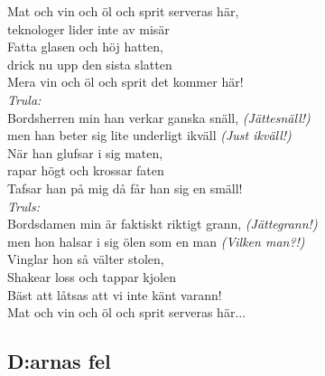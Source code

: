 \noindent Mat och vin och öl och sprit serveras här,\\
\noindent teknologer lider inte av misär\\
\noindent Fatta glasen och höj hatten,\\
\noindent drick nu upp den sista slatten\\
\noindent Mera vin och öl och sprit det kommer här!\\

\noindent \textit{Trula:}\\
\noindent Bordsherren min han verkar ganska snäll, \textit{(Jättesnäll!)}\\
\noindent men han beter sig lite underligt ikväll \textit{(Just ikväll!)}\\
\noindent När han glufsar i sig maten,\\
\noindent rapar högt och krossar faten\\
\noindent Tafsar han på mig då får han sig en smäll!\\

\noindent \textit{Truls:}\\
\noindent Bordsdamen min är faktiskt riktigt grann, \textit{(Jättegrann!)}\\
\noindent men hon halsar i sig ölen som en man \textit{(Vilken man?!)}\\
\noindent Vinglar hon så välter stolen,\\
\noindent Shakear loss och tappar kjolen\\
\noindent Bäst att låtsas att vi inte känt varann!\\

\noindent Mat och vin och öl och sprit serveras här...\\


\newpage


\subsection*{D:arnas fel} 

